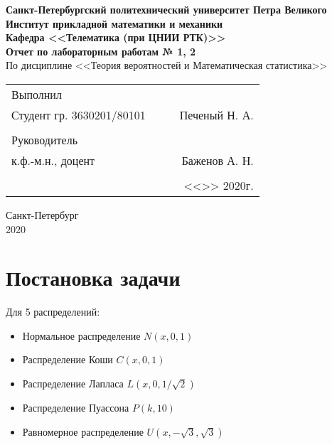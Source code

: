 \documentclass[12pt]{article}
\begin{document}
\begin{titlepage}
	\begin{center}
		\hfill \break
		{\textbf{Санкт-Петербургский политехнический университет Петра Великого}}\\
		\hfill \break
		\textbf{Институт прикладной математики и механики}\\
		 \hfill \break
		\textbf{Кафедра <<Телематика (при ЦНИИ РТК)>>}\\
		\vfill
		\large{\bfseries Отчет по лабораторным работам № 1, 2}\\
		\hfill \break
		\hfill \break
		\hfill \break
		\hfill \break
		По дисциплине <<Теория вероятностей и Математическая статистика>>\\
		\hfill \break
		\hfill \break
		\hfill \break
	\end{center}
 
	\normalsize
	{ 
		\begin{tabular}{lp{2cm}cr}
			Выполнил &&&\\
			Студент гр. 3630201/80101&&\underline{\hspace{1.5cm}}& Печеный Н. А.\\\\
			Руководитель&&&\\ 
			к.ф.-м.н., доцент && \underline{\hspace{1.5cm}}& Баженов А. Н. \\\\
			&&&<<\underline{\phantom{333}}>>\underline{\phantom{сентября000}}
			2020г.
		\end{tabular}
	}
\vfill

\begin{center} Санкт-Петербург \\2020 \end{center}
\end{titlepage}

\newpage

\setcounter{page}{2}

\setlength{\parindent}{1cm}

\tableofcontents

\newpage

\listoffigures

\newpage

\listoftables

\newpage

\section{Постановка задачи}
Для 5 распределений:
\begin{itemize}
    \item Нормальное распределение $N(x, 0, 1)$
    \item Распределение Коши $C(x, 0, 1)$
    \item Распределение Лапласа $L(x, 0, 1/\sqrt{2})$
    \item Распределение Пуассона $P(k, 10)$
    \item Равномерное распределение $U(x, -\sqrt{3}, \sqrt{3})$
\end{itemize}
\end{document}
